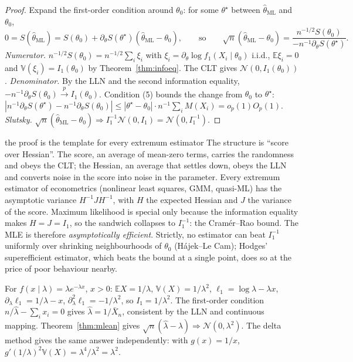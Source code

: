\documentclass[11pt,a4paper]{article}
\newcommand{\E}{\mathbb{E}}
\newcommand{\V}{\mathbb{V}}
\newcommand{\N}{\mathcal{N}}
\newcommand{\cp}{\xrightarrow{\;p\;}}
\newcommand{\cd}{\Rightarrow}
\newcommand{\op}{o_p}
\newcommand{\Op}{O_p}
\newcommand{\iid}{i.i.d.}
\newcommand{\Xbar}{\bar X_n}
\newcommand{\thml}{\hat\theta_{\mathrm{ML}}}
\begin{document}
\begin{proof}
Expand the first-order condition around $\theta_0$: for some $\theta^\star$ between $\thml$ and $\theta_0$,
\[
0=S(\thml)=S(\theta_0)+\partial_\theta S(\theta^\star)(\thml-\theta_0),\qquad\text{so}\qquad
\sqrt n(\thml-\theta_0)=\frac{n^{-1/2}S(\theta_0)}{-n^{-1}\partial_\theta S(\theta^\star)} .
\]
\emph{Numerator.} $n^{-1/2}S(\theta_0)=n^{-1/2}\sum_i\xi_i$ with $\xi_i=\partial_\theta\log f_1(X_i\mid\theta_0)$ \iid, $\E\xi_i=0$ and $\V(\xi_i)=I_1(\theta_0)$ by Theorem~\ref{thm:infoeq}. The CLT gives $\N(0,I_1(\theta_0))$.
\emph{Denominator.} By the LLN and the second information equality, $-n^{-1}\partial_\theta S(\theta_0)\cp I_1(\theta_0)$. Condition (5) bounds the change from $\theta_0$ to $\theta^\star$: $|n^{-1}\partial_\theta S(\theta^\star)-n^{-1}\partial_\theta S(\theta_0)|\le|\theta^\star-\theta_0|\cdot n^{-1}\sum_iM(X_i)=\op(1)\Op(1)$.
\emph{Slutsky.} $\sqrt n(\thml-\theta_0)\cd I_1^{-1}\N(0,I_1)=\N(0,I_1^{-1})$.
\end{proof}

\begin{whybox}{the proof is the template for every extremum estimator}
The structure is ``score over Hessian''. The score, an average of mean-zero terms, carries the randomness and obeys the CLT; the Hessian, an average that settles down, obeys the LLN and converts noise in the score into noise in the parameter. Every extremum estimator of econometrics (nonlinear least squares, GMM, quasi-ML) has the asymptotic variance $H^{-1}JH^{-1}$, with $H$ the expected Hessian and $J$ the variance of the score. Maximum likelihood is special only because the information equality makes $H=J=I_1$, so the sandwich collapses to $I_1^{-1}$: the Cram\'er--Rao bound. The MLE is therefore \emph{asymptotically efficient}. Strictly, no estimator can beat $I_1^{-1}$ uniformly over shrinking neighbourhoods of $\theta_0$ (H\'ajek--Le Cam); Hodges' superefficient estimator, which beats the bound at a single point, does so at the price of poor behaviour nearby.
\end{whybox}

\begin{example}[Exponential]
For $f(x\mid\lambda)=\lambda e^{-\lambda x}$, $x>0$: $\E X=1/\lambda$, $\V(X)=1/\lambda^2$, $\ell_1=\log\lambda-\lambda x$, $\partial_\lambda\ell_1=1/\lambda-x$, $\partial_\lambda^2\ell_1=-1/\lambda^2$, so $I_1=1/\lambda^2$. The first-order condition $n/\hat\lambda-\sum_ix_i=0$ gives $\hat\lambda=1/\Xbar$, consistent by the LLN and continuous mapping. Theorem~\ref{thm:mlean} gives $\sqrt n(\hat\lambda-\lambda)\cd\N(0,\lambda^2)$. The delta method gives the same answer independently: with $g(x)=1/x$, $g'(1/\lambda)^2\V(X)=\lambda^4/\lambda^2=\lambda^2$.
\end{example}
\end{document}
